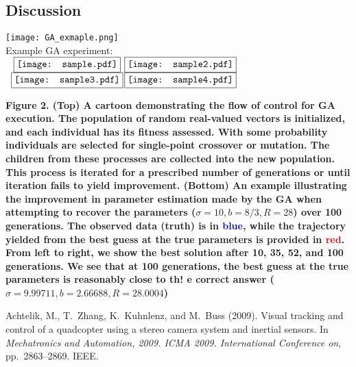 \documentclass[onecolumn]{article}
\begin{document}
\begin{multicols}{2}
\section{Discussion}

\clearpage
\begin{center}
	\texttt{[image: GA\_exmaple.png]}\\
	{\flushleft Example GA experiment:}\\
	$\begin{array}{cc}
		\fbox{\texttt{[image: sample.pdf]}}&
		\hspace{-.3cm}\fbox{\texttt{[image: sample2.pdf]}}\\
		\fbox{\texttt{[image: sample3.pdf]}}&		
		\hspace{-.3cm}\fbox{\texttt{[image: sample4.pdf]}}				
	\end{array}$
\end{center}
{\bf\small Figure 2. (Top) A cartoon demonstrating the flow of control for GA execution. The population of random real-valued vectors is initialized, and each individual has its fitness assessed. With some probability individuals are selected for single-point crossover or mutation. The children from these processes are collected into the new population. This process is iterated for a prescribed number of generations or until iteration fails to yield improvement. (Bottom) An example illustrating the improvement in parameter estimation made by the GA when attempting to recover the parameters ($\sigma=10,b=8/3,R=28$) over 100 generations. The observed data (truth) is in \textcolor{blue}{blue}, while the trajectory yielded from the best guess at the true parameters is provided in \textcolor{red}{red}. From left to right, we show the best solution after 10, 35, 52, and 100 generations. We see that at 100 generations, the best guess at the true parameters is reasonably close to th!
 e correct answer ($\sigma=9.99711,b=2.66688,R=28.0004$)}\\
\clearpage

\begin{thebibliography}{9}

        Achtelik, M., T.~Zhang, K.~Kuhnlenz, and M.~Buss (2009).
        \newblock Visual tracking and control of a quadcopter using a stereo camera
          system and inertial sensors.
        \newblock In {\em Mechatronics and Automation, 2009. ICMA 2009. International
          Conference on}, pp.\	2863--2869. IEEE.
        

\end{thebibliography}
\end{multicols}
\end{document}
